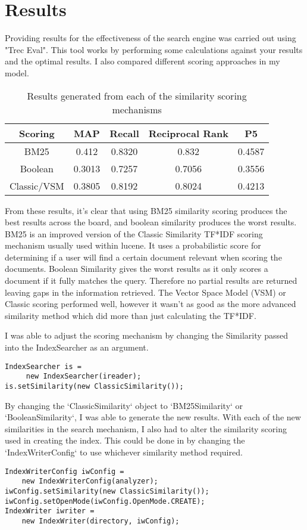 \section{Results}
Providing results for the effectiveness of the search engine was carried out using "Trec Eval". This tool works by performing some calculations against your results and the optimal results. I also compared different scoring approaches in my model.\newline
\begin{table}[H]
\begin{tabular}{
|| c c c c c ||
}
\hline Scoring & MAP & Recall & Reciprocal Rank & P5 \\
\hline\hline
BM25 & 0.412 & 0.8320 & 0.832 & 0.4587 \\
\hline
Boolean & 0.3013 & 0.7257 & 0.7056 & 0.3556 \\
\hline
Classic/VSM & 0.3805 & 0.8192 & 0.8024 & 0.4213\\
\hline

\end{tabular}
\caption{Results generated from each of the similarity scoring mechanisms}
\end{table}
From these results, it's clear that using BM25 similarity scoring produces the best results across the board, and boolean similarity produces the worst results. BM25 is an improved version of the Classic Similarity TF*IDF scoring mechanism usually used within lucene. It uses a probabilistic score for determining if a user will find a certain document relevant when scoring the documents. Boolean Similarity gives the worst results as it only scores a document if it fully matches the query. Therefore no partial results are returned leaving gaps in the information retrieved. The Vector Space Model (VSM) or Classic scoring performed well, however it wasn't as good as the more advanced similarity method which did more than just calculating the TF*IDF.\par 
I was able to adjust the scoring mechanism by changing the Similarity passed into the IndexSearcher as an argument.
\begin{lstlisting}
IndexSearcher is = 
	 new IndexSearcher(ireader);
is.setSimilarity(new ClassicSimilarity());
\end{lstlisting}
By changing the `ClassicSimilarity` object to `BM25Similarity` or `BooleanSimilarity`, I was able to generate the new results. With each of the new similarities in the search mechanism, I also had to alter the similarity scoring used in creating the index. This could be done in by changing the `IndexWriterConfig` to use whichever similarity method required. 
\begin{lstlisting}
IndexWriterConfig iwConfig = 
	new IndexWriterConfig(analyzer);
iwConfig.setSimilarity(new ClassicSimilarity());
iwConfig.setOpenMode(iwConfig.OpenMode.CREATE);
IndexWriter iwriter = 
	new IndexWriter(directory, iwConfig);
	
\end{lstlisting}

